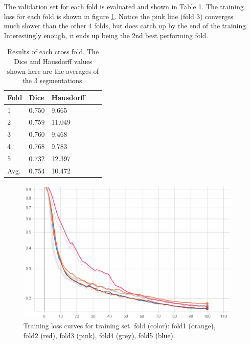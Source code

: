 \documentclass[10pt,twocolumn,letterpaper]{article}
\begin{document}
The validation set for each fold is evaluated and shown in Table \ref{table: dice and hausdorff}. The training loss for each fold is shown in figure \ref{fig: training loss}. Notice the pink line (fold 3) converges much slower than the other 4 folds, but does catch up by the end of the training. Interestingly enough, it ends up being the 2nd best performing fold.

\begin{table}[h]
   \begin{center}
       \begin{tabular}{l l l l l}
         Fold &
         \multicolumn{1}{p{2em}}{\centering Dice} &
         \multicolumn{1}{p{3em}}{\centering Hausdorff} \\
         \hline
         1 & 0.750 & 9.665 \\
         2 & 0.759 & 11.049 \\
         3 & 0.760 & 9.468 \\
         4 & 0.768 & 9.783 \\ 
         5 & 0.732 & 12.397 \\
         Avg. & 0.754 & 10.472
      \end{tabular}
   \end{center}
   \caption{Results of each cross fold. The Dice and Hausdorff values shown here are the averages of the 3 segmentations.}
   \label{table: dice and hausdorff}
\end{table}

\begin{figure}[h]
   \begin{center}
      \includegraphics[width=0.95\linewidth]{images/training_loss.png}
   \end{center}
   \caption{Training loss curves for training set. fold (color): fold1 (orange), fold2 (red), fold3 (pink), fold4 (grey), fold5 (blue).}
\label{fig: training loss}
\end{figure}
\end{document}
